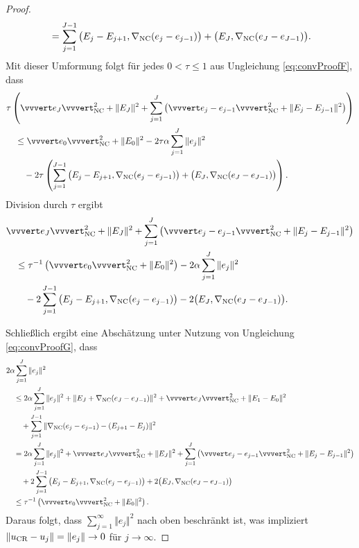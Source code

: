 \begin{proof}
\begin{align*}
    &\quad = 
    \sum_{j=1}^{J-1} 
    \big(E_j-E_{j+1},\nabla_\textup{NC}(e_j-e_{j-1})\big)
    +\big(E_J,\nabla_\textup{NC}(e_J-e_{J-1})\big).
  \end{align*}
  Mit dieser Umformung folgt für jedes $0<\tau\leq 1$ aus Ungleichung
  \eqref{eq:convProofF}, dass
  \begin{align*}
    &\tau\left(\vvvert e_J \vvvert^2_\nc +\Vert E_J \Vert^2 
    +\sum_{j=1}^J\left(\vvvert e_j-e_{j-1} \vvvert_\nc^2 + 
    \Vert E_j-E_{j-1}\Vert^2\right)\right) \\
    &\quad \leq 
    \vvvert e_0 \vvvert_\nc^2 + \Vert E_0 \Vert^2 
    -2\tau\alpha\sum_{j=1}^J \Vert e_j\Vert^2 \\
    &\quad\quad
    -2\tau\left( 
    \sum_{j=1}^{J-1} 
    \big(E_j-E_{j+1},\gradnc(e_j-e_{j-1})\big)
    +\big(E_J,\gradnc(e_J-e_{J-1})\big)\right).
  \end{align*}
  Division durch $\tau$ ergibt
  \begin{equation}
    \label{eq:convProofG}
    \begin{aligned}
      &\vvvert e_J \vvvert^2_\nc +\Vert E_J \Vert^2 
      +\sum_{j=1}^J\left(\vvvert e_j-e_{j-1} \vvvert_\nc^2 + 
      \Vert E_j-E_{j-1}\Vert^2\right) \\
      &\quad \leq 
      \tau^{-1}\left(\vvvert e_0 \vvvert_\nc^2 + \Vert E_0 \Vert^2 \right)
      -2\alpha\sum_{j=1}^J \Vert e_j\Vert^2 \\
      &\quad\quad
      -2 \sum_{j=1}^{J-1} \big(E_j-E_{j+1},\gradnc(e_j-e_{j-1})\big)
      -2\big(E_J,\gradnc(e_J-e_{J-1})\big).
    \end{aligned}
  \end{equation}

  Schließlich ergibt eine Abschätzung unter Nutzung von Ungleichung
  \eqref{eq:convProofG}, dass
  \begin{align*}
    &2\alpha\sum_{j=1}^J\Vert e_j\Vert^2 \\
    &\quad\leq
    2\alpha\sum_{j=1}^J\Vert e_j\Vert^2
    +\Vert E_J + \gradnc(e_J-e_{J-1}) \Vert^2 
    + \vvvert e_J \vvvert^2_\nc 
    + \Vert E_1 - E_0 \Vert^2 \\
    &\quad\quad
    + \sum_{j=1}^{J-1}  
      \Vert \gradnc(e_j-e_{j-1}) - (E_{j+1} - E_j ) \Vert^2 \\
    & \quad= 
    2\alpha\sum_{j=1}^J\Vert e_j\Vert^2
    +\vvvert e_J \vvvert^2_\nc + \Vert E_J \Vert^2 
    + \sum_{j=1}^J \left( \vvvert e_j-e_{j-1} \vvvert^2_\nc
    + \Vert E_j - E_{j-1} \Vert^2 \right)\\
    &\quad\quad
    + 2\sum_{j=1}^{J-1}\big(E_j-E_{j+1},\gradnc(e_j-e_{j-1})\big)
    + 2\big(E_{J},\gradnc(e_J-e_{J-1})\big) \\
    &\quad\leq
    \tau^{-1}\left(\vvvert e_0\vvvert^2_\nc + \Vert E_0\Vert^2\right).
  \end{align*}
  Daraus folgt, dass $\sum_{j=1}^\infty \Vert e_j\Vert^2$ nach oben beschränkt
  ist, was impliziert $\Vert u_\textup{CR}-u_j\Vert=\Vert e_j\Vert\rightarrow 0$ für
  $j\rightarrow \infty$.
\end{proof}


